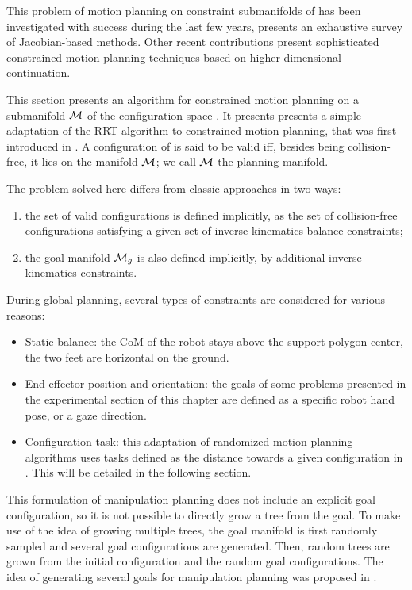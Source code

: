 This problem of motion planning on constraint submanifolds of \cspace
has been investigated with success during the last few years,
\cite{Berenson15032011} presents an exhaustive survey of
Jacobian-based methods. Other recent contributions
\cite{porta2012randomized} present sophisticated constrained motion
planning techniques based on higher-dimensional continuation.

This section presents an algorithm for constrained motion planning on
a submanifold $\mathcal{M}$ of the configuration space \cspace. It
presents presents a simple adaptation of the RRT algorithm to
constrained motion planning, that was first introduced in
\cite{dalibard09}. A configuration \config{} of \cspace is said to be valid
iff, besides being collision-free, it lies on the manifold
$\mathcal{M}$; we call $\mathcal{M}$ the planning manifold.

The problem solved here differs from classic approaches in two ways:
\begin{enumerate}
\item the set of valid configurations is defined implicitly, as the
  set of collision-free configurations satisfying a given set of
  inverse kinematics balance constraints;
\item the goal manifold $\mathcal{M}_{g}$ is also defined implicitly,
  by additional inverse kinematics constraints.
\end{enumerate}
During global planning, several types of constraints are considered
for various reasons:
\begin{itemize}
\item Static balance: the CoM of the robot stays above the support
  polygon center, the two feet are horizontal on the ground.
\item End-effector position and orientation: the goals of some
  problems presented in the experimental section of this chapter are
  defined as a specific robot hand pose, or a gaze direction.
\item Configuration task: this adaptation of randomized motion
  planning algorithms uses tasks defined as the distance towards a
  given configuration in \cspace. This will be detailed in the
  following section.
\end{itemize}

This formulation of manipulation planning does not include an explicit
goal configuration, so it is not possible to directly grow a tree from
the goal. To make use of the idea of growing multiple trees, the goal
manifold is first randomly sampled and several goal configurations are
generated. Then, random trees are grown from the initial configuration
and the random goal configurations. The idea of generating several
goals for manipulation planning was proposed in \cite{diankov2008bpc}.


